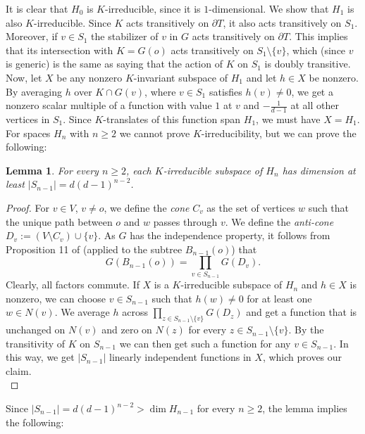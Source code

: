 \documentclass{article}
\theoremstyle{definition}
\theoremstyle{remark}
\theoremstyle{plain}
\newtheorem{lem}[dfn]{Lemma}
\begin{document}
It is clear that $H_0$ is $K$-irreducible, since it is $1$-dimensional. We show that $H_1$ is also $K$-irreducible. Since $K$ acts transitively on $\partial T$, it also acts transitively on $S_1$. Moreover, if $v\in S_1$ the stabilizer of $v$ in $G$ acts transitively on $\partial T$. This implies that its intersection with $K=G(o)$ acts transitively on $S_1\setminus\{v\}$, which (since $v$ is generic) is the same as saying that the action of $K$ on $S_1$ is doubly transitive. Now, let $X$ be any nonzero $K$-invariant subspace of $H_1$ and let $h\in X$ be nonzero. By averaging $h$ over $K\cap G(v)$, where $v\in S_1$ satisfies $h(v)\neq 0$, we get a nonzero scalar multiple of a function with value $1$ at $v$ and $-\frac{1}{d-1}$ at all other vertices in $S_1$. Since $K$-translates of this function span $H_1$, we must have $X=H_1$. \\

For spaces $H_n$ with $n\geq 2$ we cannot prove $K$-irreducibility, but we can prove the following:

\begin{lem} \label{dimbound}
For every $n\geq 2$, each $K$-irreducible subspace of $H_n$ has dimension at least $\vert S_{n-1}\vert=d(d-1)^{n-2}$.
\end{lem}

\begin{proof}
For $v\in V$, $v\neq o$, we define the \textit{cone} $C_v$ as the set of vertices $w$ such that the unique path between $o$ and $w$ passes through $v$. We define the \textit{anti-cone} $D_v:=(V\setminus C_v)\cup\{v\}$. As $G$ has the independence property, it follows from Proposition 11 of \cite{amann} (applied to the subtree $B_{n-1}(o)$) that $$G(B_{n-1}(o))=\prod_{v\in S_{n-1}}G(D_v).$$ Clearly, all factors commute. If $X$ is a $K$-irreducible subspace of $H_n$ and $h\in X$ is nonzero, we can choose $v\in S_{n-1}$ such that $h(w)\neq 0$ for at least one $w\in N(v)$. We average $h$ across $\prod_{z\in S_{n-1}\setminus\{v\}}G(D_z)$ and get a function that is unchanged on $N(v)$ and zero on $N(z)$ for every $z\in S_{n-1}\setminus\{v\}$. By the transitivity of $K$ on $S_{n-1}$ we can then get such a function for any $v\in S_{n-1}$. In this way, we get $\vert S_{n-1}\vert$ linearly independent functions in $X$, which proves our claim. \\
\end{proof}

Since $\vert S_{n-1}\vert=d(d-1)^{n-2}>\dim{H_{n-1}}$ for every $n\geq 2$, the lemma implies the following:
\end{document}
